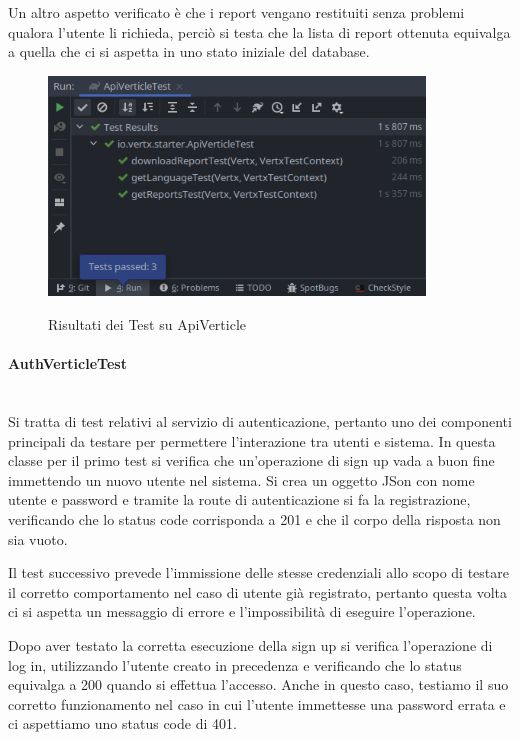\noindent Un altro aspetto verificato è che i report vengano restituiti senza problemi qualora l'utente li richieda, perciò si testa che la lista di report ottenuta equivalga a quella che ci si aspetta in uno stato iniziale del database.
\begin{figure}[H]
    \caption{Risultati dei Test su ApiVerticle}
    \centering
    \includegraphics[width=100mm]{img/general/test_api.png}
    \label{fig:api_test}
\end{figure}

\paragraph{AuthVerticleTest}\mbox{}\\
Si tratta di test relativi al servizio di autenticazione, pertanto uno dei componenti principali da testare per permettere l'interazione tra utenti e sistema. In questa classe per il primo test si verifica che un'operazione di sign up vada a buon fine immettendo un nuovo utente nel sistema. Si crea un oggetto JSon con nome utente e password e tramite la route di autenticazione si fa la registrazione, verificando che lo status code corrisponda a 201 e che il corpo della risposta non sia vuoto. \newline

\noindent Il test successivo prevede l'immissione delle stesse credenziali allo scopo di testare il corretto comportamento nel caso di utente già registrato, pertanto questa volta ci si aspetta un messaggio di errore e l'impossibilità di eseguire l'operazione. \newline

\noindent Dopo aver testato la corretta esecuzione della sign up si verifica l'operazione di log in, utilizzando l'utente creato in precedenza e verificando che lo status equivalga a 200 quando si effettua l'accesso. Anche in questo caso, testiamo il suo corretto funzionamento nel caso in cui l'utente immettesse una password errata e ci aspettiamo uno status code di 401.

